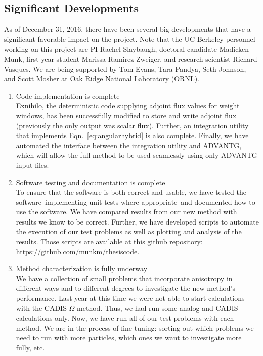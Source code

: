 \documentclass[12pt]{article}
\newcommand{\co}{CADIS-$\Omega$ }
\begin{document}
\subsection{Significant Developments}
\label{sect::sig-devel}

As of December 31, 2016, there have been several big developments that have a significant favorable impact on the project. 
Note that the UC Berkeley personnel working on this project are PI Rachel Slaybaugh, doctoral candidate Madicken Munk, first year student Marissa Ramirez-Zweiger, and research scientist Richard Vasques. 
We are being supported by Tom Evans, Tara Pandya, Seth Johnson, and Scott Mosher at Oak Ridge National Laboratory (ORNL). 
\begin{enumerate}
\item Code implementation is complete\\
Exnihilo, the deterministic code supplying adjoint flux values for weight windows, has been successfully modified to store and write adjoint flux (previously the only output was scalar flux). 
Further, an integration utility that implements Eqn.~\eqref{eq:angularhybrid} is also complete. 
Finally, we have automated the interface between the integration utility and ADVANTG, which will allow the full method to be used seamlessly using only ADVANTG input files. 

\item Software testing and documentation is complete\\
To ensure that the software is both correct and usable, we have tested the software--implementing unit tests where appropriate--and documented how to use the software. 
We have compared results from our new method with results we know to be correct. 
Further, we have developed scripts to automate the execution of our test problems as well as plotting and analysis of the results. 
Those scripts are available at this github repository: \url{https://github.com/munkm/thesiscode}. 
 
\item Method characterization is fully underway \\
We have a collection of small problems that incorporate anisotropy in different ways and to different degrees to investigate the new method's performance. 
Last year at this time we were not able to start calculations with the \co method. 
Thus, we had run some analog and CADIS calculations only.
Now, we have run all of our test problems with each method. 
We are in the process of fine tuning: sorting out which problems we need to run with more particles, which ones we want to investigate more fully, etc.


\end{enumerate}
\end{document}
